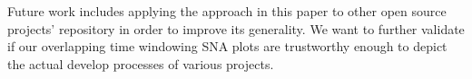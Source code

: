 \documentclass[10pt, conference, compsocconf]{IEEEtran}
\begin{document}
Future work includes applying the approach in this paper to other open
source projects' repository in order to improve its generality. We
want to further validate if our overlapping time windowing SNA plots
are trustworthy enough to depict the actual develop processes of
various projects.











\balance

\end{document}
